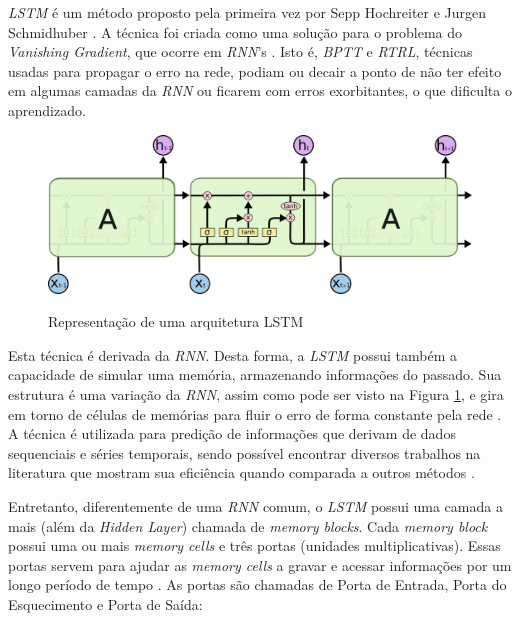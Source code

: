 \textit{\acrshort{LSTM}} é um método proposto pela primeira vez por Sepp Hochreiter e Jurgen Schmidhuber \cite{doi:10.1162/neco.1997.9.8.1735}. A técnica foi criada como uma solução para o problema do \textit{Vanishing Gradient}, que ocorre em \textit{\acrshort{RNN}}'s \cite{doi:10.1162/neco.1997.9.8.1735}. Isto é, \textit{\acrfull{BPTT}} e \textit{\acrfull{RTRL}}, técnicas usadas para propagar o erro na rede, podiam ou decair a ponto de não ter efeito em algumas camadas da \textit{\acrshort{RNN}} ou ficarem com erros exorbitantes, o que dificulta o aprendizado. 

\begin{figure}[htbp]
    \centering
    \includegraphics[scale=0.4]{monography/img/models/lstm3.png}
    \label{figure:lstm}
    \caption[Representação de uma arquitetura LSTM]{Representação de uma arquitetura LSTM\footnotemark}
\end{figure}

Esta técnica é derivada da \textit{\acrshort{RNN}}. Desta forma, a \textit{\acrshort{LSTM}} possui também a capacidade de simular uma memória, armazenando informações do passado. Sua estrutura é uma variação da \textit{\acrshort{RNN}}, assim como pode ser visto na Figura \ref{figure:lstm}, e gira em torno de células de memórias para fluir o erro de forma constante pela rede \cite{doi:10.1162/neco.1997.9.8.1735}. A técnica é utilizada para predição de informações que derivam de dados sequenciais e séries temporais, sendo possível encontrar diversos trabalhos na literatura que mostram sua eficiência quando comparada a outros métodos \cite{alex2012}.

Entretanto, diferentemente de uma \textit{\acrshort{RNN}} comum, o \textit{\acrshort{LSTM}} possui uma camada a mais (além da \textit{Hidden Layer}) chamada de \textit{memory blocks}. Cada \textit{memory block} possui uma ou mais \textit{memory cells} e três portas (unidades multiplicativas). Essas portas servem para ajudar as \textit{memory cells} a gravar e acessar informações por um longo período de tempo \cite{alex2012}. As portas são chamadas de Porta de Entrada, Porta do Esquecimento e Porta de Saída:

